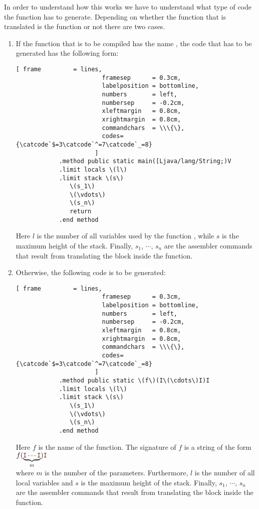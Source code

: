 In order to understand how this works we have to understand what type of code the function  has
to generate.  Depending on whether the function that is translated is the function  or not there
are two cases.
\begin{enumerate}
\item If the function that  is to be compiled has the name , the code that has to be generated
      has the following form:

      \begin{Verbatim}[ frame         = lines, 
                        framesep      = 0.3cm, 
                        labelposition = bottomline,
                        numbers       = left,
                        numbersep     = -0.2cm,
                        xleftmargin   = 0.8cm,
                        xrightmargin  = 0.8cm,
                        commandchars  = \\\{\},
                        codes={\catcode`$=3\catcode`^=7\catcode`_=8}
                      ]
            .method public static main([Ljava/lang/String;)V
            .limit locals \(l\) 
            .limit stack \(s\)
               \(s_1\)
               \(\vdots\)
               \(s_n\)
               return
            .end method
       \end{Verbatim}

       Here $l$ is the number of all variables used by the function , while $s$ is the maximum
       height of the stack.
       Finally,  $s_1$, $\cdots$, $s_n$ are the assembler commands that result from translating the block
       inside the function.
\item Otherwise, the following code is to be generated:

      \begin{Verbatim}[ frame         = lines, 
                        framesep      = 0.3cm, 
                        labelposition = bottomline,
                        numbers       = left,
                        numbersep     = -0.2cm,
                        xleftmargin   = 0.8cm,
                        xrightmargin  = 0.8cm,
                        commandchars  = \\\{\},
                        codes={\catcode`$=3\catcode`^=7\catcode`_=8}
                      ]
            .method public static \(f\)(I\(\cdots\)I)I
            .limit locals \(l\) 
            .limit stack \(s\)
               \(s_1\)
               \(\vdots\)
               \(s_n\)
            .end method
       \end{Verbatim}
       
       Here $f$ is the name of the function.  The signature of $f$ is a string of the form
       \\[0.2cm]
       \hspace*{1.3cm}
       $f(\underbrace{\mytt{I}\cdots\mytt{I}}_{m})\mytt{I}$
       \\[0.2cm]
       where $m$ is the number of the parameters.  Furthermore, 
       $l$ is the number of all local variables and  $s$
       is the maximum height of the stack.  Finally,
       $s_1$, $\cdots$, $s_n$ are the assembler commands that result from translating the block inside the function.
\end{enumerate}
